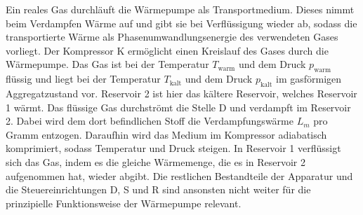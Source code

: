 Ein reales Gas durchläuft die Wärmepumpe als Transportmedium. Dieses nimmt beim Verdampfen
Wärme auf und gibt sie bei Verflüssigung wieder ab, sodass die transportierte Wärme
als Phasenumwandlungsenergie des verwendeten Gases vorliegt. Der Kompressor K ermöglicht
einen Kreislauf des Gases durch die Wärmepumpe. Das Gas ist bei der Temperatur $T_\text{warm}$
und dem Druck $p_\text{warm}$ flüssig und liegt bei der Temperatur $T_\text{kalt}$ und dem
Druck $p_\text{kalt}$ im gasförmigen Aggregatzustand vor. Reservoir 2 ist hier das
kältere Reservoir, welches Reservoir 1 wärmt. Das flüssige Gas durchströmt die Stelle D
und verdampft im Reservoir 2. Dabei wird dem dort befindlichen Stoff die Verdampfungswärme
$L_m$ pro Gramm entzogen. Daraufhin wird das Medium im Kompressor adiabatisch komprimiert,
sodass Temperatur und Druck steigen. In Reservoir 1 verflüssigt sich das Gas, indem es
die gleiche Wärmemenge, die es in Reservoir 2 aufgenommen hat, wieder abgibt.
Die restlichen Bestandteile der Apparatur und die Steuereinrichtungen D, S und R sind
ansonsten nicht weiter für die prinzipielle Funktionsweise der Wärmepumpe relevant.

